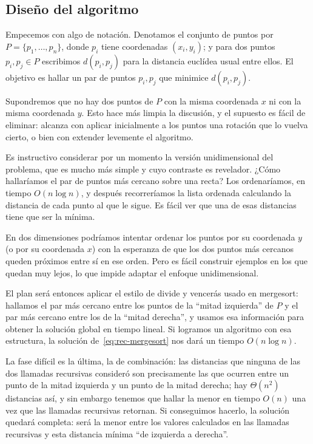 \documentclass[12pt, spanish, oneside, openany]{book}
\theoremstyle{uprightplain}
\theoremstyle{definition}
\theoremstyle{remark}
\theoremstyle{definition}
\begin{document}
\subsection{Diseño del algoritmo}

Empecemos con algo de notación. Denotamos el conjunto de puntos por $P=\{p_1,\dots,p_n\}$, donde $p_i$ tiene coordenadas $(x_i,y_i)$; y para dos puntos $p_i,p_j\in P$ escribimos $d(p_i,p_j)$ para la distancia euclídea usual entre ellos. El objetivo es hallar un par de puntos $p_i,p_j$ que minimice $d(p_i,p_j)$.

Supondremos que no hay dos puntos de $P$ con la misma coordenada $x$ ni con la misma coordenada $y$. Esto hace más limpia la discusión, y el supuesto es fácil de eliminar: alcanza con aplicar inicialmente a los puntos una rotación que lo vuelva cierto, o bien con extender levemente el algoritmo.

Es instructivo considerar por un momento la versión unidimensional del problema, que es mucho más simple y cuyo contraste es revelador. ¿Cómo hallaríamos el par de puntos más cercano sobre una recta? Los ordenaríamos, en tiempo $O(n\log n)$, y después recorreríamos la lista ordenada calculando la distancia de cada punto al que le sigue. Es fácil ver que una de esas distancias tiene que ser la mínima.

En dos dimensiones podríamos intentar ordenar los puntos por su coordenada $y$ (o por su coordenada $x$) con la esperanza de que los dos puntos más cercanos queden próximos entre sí en ese orden. Pero es fácil construir ejemplos en los que quedan muy lejos, lo que impide adaptar el enfoque unidimensional.

El plan será entonces aplicar el estilo de divide y vencerás usado en mergesort: hallamos el par más cercano entre los puntos de la ``mitad izquierda'' de $P$ y el par más cercano entre los de la ``mitad derecha'', y usamos esa información para obtener la solución global en tiempo lineal. Si logramos un algoritmo con esa estructura, la solución de~\eqref{eq:rec-mergesort} nos dará un tiempo $O(n\log n)$.

La fase difícil es la última, la de combinación: las distancias que ninguna de las dos llamadas recursivas consideró son precisamente las que ocurren entre un punto de la mitad izquierda y un punto de la mitad derecha; hay $\Theta(n^2)$ distancias así, y sin embargo tenemos que hallar la menor en tiempo $O(n)$ una vez que las llamadas recursivas retornan. Si conseguimos hacerlo, la solución quedará completa: será la menor entre los valores calculados en las llamadas recursivas y esta distancia mínima ``de izquierda a derecha''.
\end{document}

